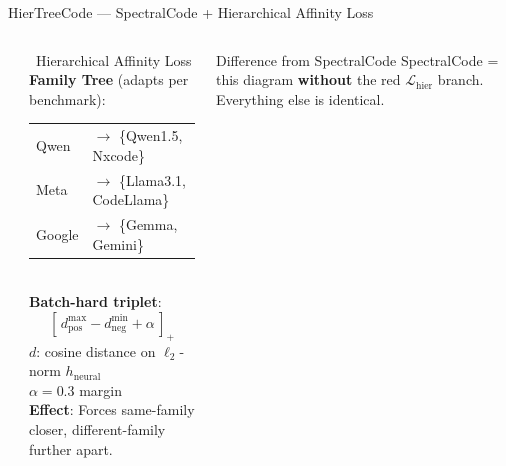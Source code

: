 \documentclass[aspectratio=169, 10pt]{beamer}
\begin{document}
\begin{frame}{HierTreeCode --- SpectralCode + Hierarchical Affinity Loss}
\begin{columns}[T]
\begin{center}
\end{center}

\begin{alertblock}{\faStar\ Hierarchical Affinity Loss}
\scriptsize
\textbf{Family Tree} (adapts per benchmark):\\[2pt]
\begin{tabular}{ll}
Qwen & $\to$ \{Qwen1.5, Nxcode\} \\
Meta & $\to$ \{Llama3.1, CodeLlama\} \\
Google & $\to$ \{Gemma, Gemini\} \\
\end{tabular}\\[4pt]
\textbf{Batch-hard triplet}:
$$[\,d_{\text{pos}}^{\max} - d_{\text{neg}}^{\min} + \alpha\,]_+$$
$d$: cosine distance on $\ell_2$-norm $h_{\text{neural}}$\\
$\alpha = 0.3$ margin\\[4pt]
\textbf{Effect}: Forces same-family closer, different-family further apart.
\end{alertblock}

\begin{block}{\scriptsize Difference from SpectralCode}
\scriptsize
SpectralCode = this diagram \textbf{without} the red $\mathcal{L}_{\text{hier}}$ branch. Everything else is identical.
\end{block}
\end{columns}
\end{frame}
\end{document}
